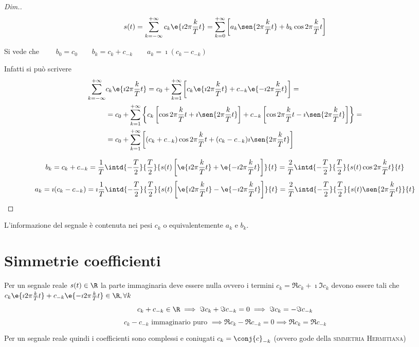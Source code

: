 \begin{proof}[Dim.]
\[
	s(t)=\sum_{k=-\infty}^{+\infty} c_k \e{\imath 2\pi\frac{k}{T}t} = \sum_{k=0}^{+\infty}\left[ a_k \sen{2\pi\frac{k}{T}t} + b_k \cos{2\pi\frac{k}{T}t}\right]
\]

Si vede che $\qquad b_0=c_0 \qquad b_k=c_k+c_{-k} \qquad a_k=\imath (c_k-c_{-k})$

Infatti si può scrivere
\begin{align*}
	\sum_{k=-\infty}^{+\infty}&c_k\e{\imath 2\pi\frac{k}{T}t}=c_0+ \sum_{k=1}^{+\infty}\left[c_k\e{\imath 2\pi\frac{k}{T}t}+c_{-k}\e{-\imath 2\pi\frac{k}{T}t}\right]=\\
	&=c_0+\sum_{k=1}^{+\infty}{\left\lbrace c_k \left[\cos{2\pi\frac{k}{T}t}+\imath\sen{2\pi\frac{k}{T}t}\right]
	+c_{-k}\left[\cos{2\pi\frac{k}{T}t}-\imath\sen{2\pi\frac{k}{T}t}\right] \right\rbrace}=\\
	&=c_0+\sum_{k=1}^{+\infty}{\left[(c_k+c_{-k}) \cos{2\pi\frac{k}{T}t}+
	(c_k-c_{-k})\imath\sen{2\pi\frac{k}{T}t}\right]}
\end{align*}

\[
	b_k=c_k+c_{-k}=\frac{1}{T}\intd{-\frac{T}{2}}{\frac{T}{2}}{s(t)\left[\e{\imath 2\pi\frac{k}{T}t}+\e{-\imath 2\pi\frac{k}{T}t}\right]}{t}=\frac{2}{T}\intd{-\frac{T}{2}}{\frac{T}{2}}{s(t)\cos{2\pi\frac{k}{T}t}}{t}
\]
\[
	a_k=\imath(c_k-c_{-k})=\imath\frac{1}{T}\intd{-\frac{T}{2}}{\frac{T}{2}}{s(t)\left[\e{\imath 2\pi\frac{k}{T}t}-\e{-\imath 2\pi\frac{k}{T}t}\right]}{t}=\frac{2}{T}\intd{-\frac{T}{2}}{\frac{T}{2}}{s(t)\sen{2\pi\frac{k}{T}t}}{t}
\]
\end{proof}

\begin{nota}
	L'informazione del segnale è contenuta nei pesi $c_k$ o equivalentemente $a_k$ e $b_k$.
\end{nota}

\section{Simmetrie coefficienti}
Per un segnale reale $s(t)\in\R$ la parte immaginaria deve essere nulla ovvero i termini $c_k=\Re{c_k}+\imath \Im{c_k}$ devono essere tali che $c_k\e{\imath 2\pi\frac{k}{T}t}+c_{-k}\e{-\imath 2\pi\frac{k}{T}t}\in\R,\forall k$
\[
	c_k+c_{-k}\in\R\implies\Im{c_k}+\Im{c_{-k}}=0\implies\Im{c_k}=-\Im{c_{-k}}
\]
\[
	c_k-c_{-k}\text{ immaginario puro }\implies\Re{c_k}-\Re{c_{-k}}=0\implies\Re{c_k}=\Re{c_{-k}}
\]

Per un segnale reale quindi i coefficienti sono complessi e coniugati $c_k=\conj{c}_{-k}$ (ovvero gode della \textsc{simmetria Hermitiana})

